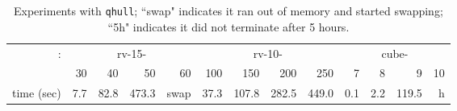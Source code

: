 \documentclass[11pt,a4paper]{article}
\begin{document}
\begin{table}[t]\centering\footnotesize
\begin{tabular}{r|rrrr|rrrr|rrrr}
\multirow{2}{.5cm}{:} & \multicolumn{4}{c}{rv-15-} & \multicolumn{4}{c}{rv-10-} & \multicolumn{4}{c}{cube-} \\
& 30 & 40 & 50 & 60 & 100 & 150 & 200 & 250 & 7 & 8 & 9 & 10 \\\hline time (sec) & 7.7 & 82.8 & 473.3 & swap & 37.3 & 107.8 & 282.5 & 449.0 & 0.1 & 2.2 & 119.5 & h\\
\end{tabular} 
\caption{ Experiments with {\tt qhull}; ``swap" indicates it
ran out of memory and started swapping; ``5h" indicates it did not
terminate after 5 hours.  \label{table:qhull_vol}}
\end{table}
\end{document}
